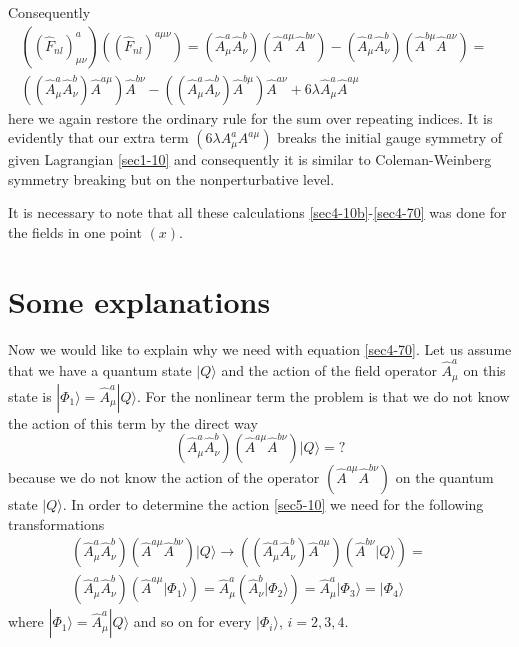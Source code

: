 \documentclass[a4paper,a4paper]{article}
\begin{document}
Consequently 
\begin{equation}
\begin{split}
\left (
  \left (
    \hat F_{nl}
  \right )^a_{\mu\nu}
\right )
\left (
  \left (
    \hat F_{nl}
  \right )^{a\mu\nu}
\right ) = 
\left (
\hat A^a_\mu \hat A^b_\nu
\right )
\left (
\hat A^{a\mu} \hat A^{b\nu}
\right ) - 
\left (
\hat A^a_\mu \hat A^b_\nu
\right )
\left (
\hat A^{b\mu} \hat A^{a\nu}
\right ) = & \\
\left( \left( \hat A^a_\mu \hat A^b_\nu \right ) 
  \hat A^{a\mu} \right ) \hat A^{b\nu} - 
\left( \left( \hat{A}^a_\mu \hat{A}^b_\nu 
  \right) \hat{A}^{b \mu} \right) \hat{A}^{a \nu} + 
6 \lambda \hat{A}^a_\mu \hat{A}^{a \mu} 
\label{sec4-70}
\end{split}
\end{equation}
here we again restore the ordinary rule for the sum over repeating 
indices. It is evidently that our extra term 
$(6 \lambda A^a_\mu A^{a\mu})$ 
breaks the initial gauge symmetry of given Lagrangian \eqref{sec1-10} 
and consequently it is similar to Coleman-Weinberg symmetry 
breaking but on the nonperturbative level. 
\par 
It is necessary to note that all these calculations 
\eqref{sec4-10b}-\eqref{sec4-70} was done for the fields 
in one point $(x)$. 

\section{Some explanations}

Now we would like to explain why we need with equation 
\eqref{sec4-70}. Let us assume that we have a quantum 
state $| Q \rangle$ and the action of the field operator 
$\hat A^a_\mu$ on this state is 
$|\Phi_1 \rangle = \hat A^a_\mu |Q \rangle$. For the nonlinear term the 
problem is that we do not know the action of this term by the 
direct way 
\begin{equation}
\left (
\hat A^a_\mu \hat A^b_\nu
\right )
\left (
\hat A^{a\mu} \hat A^{b\nu} 
\right ) | Q \rangle = ?
\label{sec5-10}
\end{equation}
because we do not know the action of the operator 
$(\hat A^{a\mu} \hat A^{b\nu})$ on the quantum state $|Q \rangle$. 
In order to determine the action \eqref{sec5-10} we need for the 
following transformations 
\begin{eqnarray}
\left (
\hat A^a_\mu \hat A^b_\nu
\right )
\left (
\hat A^{a\mu} \hat A^{b\nu} 
\right ) | Q \rangle \rightarrow 
\left (
  \left (
  \hat A^a_\mu \hat A^b_\nu
  \right )\hat A^{a\mu} 
\right ) 
\left (
\hat A^{b\nu}  | Q \rangle 
\right ) = && 
\nonumber \\
\left (
\hat A^a_\mu \hat A^b_\nu
\right )
\left (
\hat A^{a\mu} | \Phi_1 \rangle 
\right ) = 
\hat A^a_\mu 
\left (
\hat A^b_\nu | \Phi_2 \rangle 
\right ) = 
\hat A^a_\mu | \Phi_3 \rangle = 
| \Phi_4 \rangle && 
\label{sec5-20}
\end{eqnarray}
where $| \Phi_1 \rangle = \hat A^a_\mu | Q \rangle$ and so on 
for every $| \Phi_i \rangle$, $i=2,3,4$. 
\end{document}

